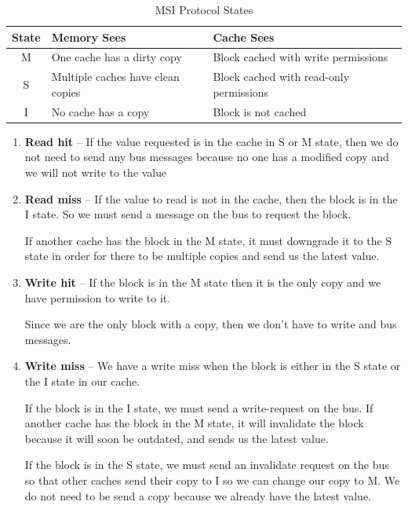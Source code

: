 \documentclass{article}
\begin{document}
\begin{table}[ht!]
\small
\begin{tabular}{cll}
\toprule
\textbf{State} & \textbf{Memory Sees} & \textbf{Cache Sees} \\
\midrule
M & One cache has a dirty copy & Block  cached with write permissions \\
S & Multiple caches have clean copies & Block cached with read-only permissions \\

I & No cache has a copy & Block is not cached \\
\toprule
\end{tabular}
\caption{MSI Protocol States}
\end{table}

\begin{enumerate}
\item \textbf{Read hit} -- If the value requested is in the cache in S or M state, then we do not need to send any bus messages because no one has a modified copy and we will not write to the value

\item \textbf{Read miss} -- If the value to read is not in the cache, then the block is in the I state. So we must send a message on the bus to request the block. 

If another cache has the block in the M state, it must downgrade it to the S state in order for there to be multiple copies and send us the latest value. 

\item \textbf{Write hit} -- If the block is in the M state then it is the only copy and we have permission to write to it. 

Since we are the only block with a copy, then we don't have to write and bus messages.


\item \textbf{Write miss} -- We have a write miss when the block is either in the S state or the I state in our cache. 

If the block is in the I state, we must send a write-request on the bus. If another cache has the block in the M state, it will invalidate the block because it will soon be outdated, and sends us the latest value.

If the block is in the S state, we must send an invalidate request on the bus so that other caches send their copy to I so we can change our copy to M. We do not need to be send a copy because we already have the latest value.

\end{enumerate}
\end{document}
